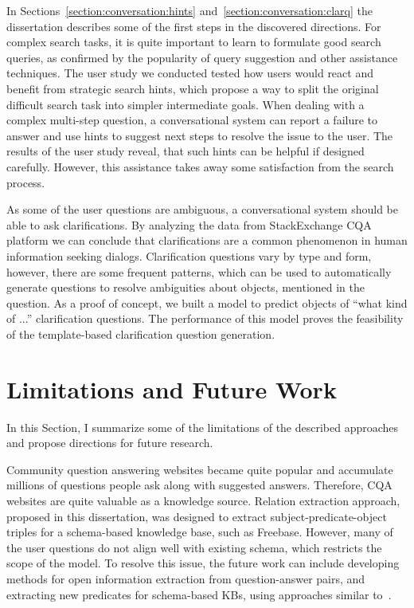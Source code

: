 In Sections~\ref{section:conversation:hints} and~\ref{section:conversation:clarq} the dissertation describes some of the first steps in the discovered directions.
For complex search tasks, it is quite important to learn to formulate good search queries, as confirmed by the popularity of query suggestion and other assistance techniques.
The user study we conducted tested how users would react and benefit from strategic search hints, which propose a way to split the original difficult search task into simpler intermediate goals.
When dealing with a complex multi-step question, a conversational system can report a failure to answer and use hints to suggest next steps to resolve the issue to the user.
The results of the user study reveal, that such hints can be helpful if designed carefully.
However, this assistance takes away some satisfaction from the search process.

As some of the user questions are ambiguous, a conversational system should be able to ask clarifications.
By analyzing the data from StackExchange CQA platform we can conclude that clarifications are a common phenomenon in human information seeking dialogs.
Clarification questions vary by type and form, however, there are some frequent patterns, which can be used to automatically generate questions to resolve ambiguities about objects, mentioned in the question.
As a proof of concept, we built a model to predict objects of ``what kind of ...'' clarification questions.
The performance of this model proves the feasibility of the template-based clarification question generation.

\section{Limitations and Future Work}
\label{section:conclusion:future_work}

In this Section, I summarize some of the limitations of the described approaches and propose directions for future research.

Community question answering websites became quite popular and accumulate millions of questions people ask along with suggested answers.
Therefore, CQA websites are quite valuable as a knowledge source.
Relation extraction approach, proposed in this dissertation, was designed to extract subject-predicate-object triples for a schema-based knowledge base, such as Freebase.
However, many of the user questions do not align well with existing schema, which restricts the scope of the model.
To resolve this issue, the future work can include developing methods for open information extraction from question-answer pairs, and extracting new predicates for schema-based KBs, \eg using approaches similar to~\cite{Gupta:2014:BOS:2732286.2732288}.

